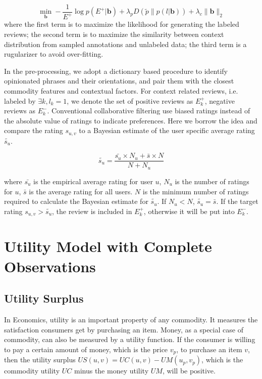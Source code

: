 \documentclass[sigconf]{acmart}
\begin{document}
\begin{equation}\label{equ:cat}
  \min_{\mathbf{b}}\!-\frac{1}{E^+}\!\log\!p(E^+|\mathbf{b})\!+\!\lambda_pD(\tilde{p}\|p(l|\mathbf{b}))\!+\!\lambda_c\|\mathbf{b}\!\|_2
\end{equation}
where the first term is to maximize the likelihood for generating the labeled reviews; the second term is to maximize the similarity between context distribution from sampled annotations and unlabeled data; the third term is a rugularizer to avoid over-fitting.

In the pre-processing, we adopt a dictionary based procedure to identify opinionated phrases and their orientations, and pair them with the closest commodity features and contextual factors. For context related reviews, i.e. labeled by $\exists k, l_k=1$, we denote the set of positive reviews as $E^+_k$, negative reviews as $E^-_k$. Conventional collaborative filtering use biased ratings instead of the absolute value of ratings to indicate preferences. Here we borrow the idea and compare the rating $s_{u,v}$ to a Bayesian estimate of the user specific average rating $\tilde{s_u}$. 

\begin{equation}\label{equ:average}
\tilde{s_u}=\frac{\bar{s_u}\times N_u+ \bar{s}\times N}{N+N_u}
\end{equation}  
 
where $\bar{s_u}$ is the empirical average rating for user $u$, $N_u$ is the number of ratings for $u$, $\bar{s}$ is the average rating for all users. $N$ is the minimum number of ratings required to calculate the Bayesian estimate for $\tilde{s_u}$. If $N_u <N$, $\tilde{s_u}= \bar{s}$. If the target rating $s_{u,v}>\tilde{s_u}$, the review is included in $E^+_k$, otherwise it will be put into $E^-_k$.
 
\section{Utility Model with Complete Observations}\label{sec:util}
\subsection{Utility Surplus}
In Economics, utility is an important property of any commodity. It measures the satisfaction consumers get by purchasing an item. Money, as a special case of commodity, can also be measured by a utility function. If the consumer is willing to pay a certain amount of money, which is the price $v_p$, to purchase an item $v$, then the utility surplus $US(u,v)=UC(u,v)-UM(u_p,v_p)$, which is the commodity utility $UC$ minus the money utility $UM$, will be positive.
\end{document}
